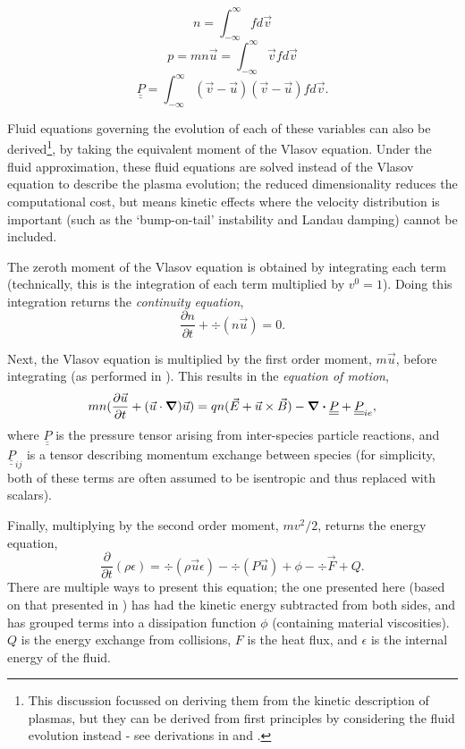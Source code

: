 \begin{equation} n = \int^{\infty}_{-\infty} f d\vec{v}  \end{equation}
\begin{equation} p = mn\vec{u} = \int^{\infty}_{-\infty} \vec{v} f d\vec{v} \end{equation}
\begin{equation} \underline{\underline{P}} = \int^{\infty}_{-\infty} (\vec{v} - \vec{u})(\vec{v} - \vec{u}) f d\vec{v}.  \end{equation}

Fluid equations governing the evolution of each of these variables can also be derived\footnote{This discussion focussed on deriving them from the kinetic description of plasmas, but they can be derived from first principles by considering the fluid evolution instead - see derivations in \cite{Chen2015} and \cite{Piel2017}.}, by taking the equivalent moment of the Vlasov equation. Under the fluid approximation, these fluid equations are solved instead of the Vlasov equation to describe the plasma evolution; the reduced dimensionality reduces the computational cost, but means kinetic effects where the velocity distribution is important (such as the `bump-on-tail' instability and Landau damping) cannot be included.

The zeroth moment of the Vlasov equation is obtained by integrating each term (technically, this is the integration of each term multiplied by $v^0 = 1$). Doing this integration returns the \textit{continuity equation},
\begin{equation} \frac{\partial n}{\partial t} + \div (n \vec{u}) = 0. \end{equation}

Next, the Vlasov equation is multiplied by the first order moment, $m\vec{u}$, before integrating (as performed in \cite{Chen2015}). This results in the \textit{equation of motion},
\begin{equation} mn(\frac{\partial \vec{u}}{\partial t} + (\vec{u} \cdot \grad)\vec{u}) = qn(\vec{E} + \vec{u} \times \vec{B}) - \div \underline{\underline{P}} + \underline{\underline{P}}_{ie} ,\end{equation}
where $\underline{\underline{P}}$ is the pressure tensor arising from inter-species particle reactions, and $\underline{\underline{P}}_{ij}$ is a tensor describing momentum exchange between species (for simplicity, both of these terms are often assumed to be isentropic and thus replaced with scalars).

Finally, multiplying by the second order moment, $mv^2 / 2$, returns the energy equation,
\begin{equation} \frac{ \partial}{\partial t} (\rho \epsilon) = \div (\rho \vec{u} \epsilon) - \div (P \vec{u}) + \phi - \div \vec{F} + Q. \label{eqn: Energy equation} \end{equation}
There are multiple ways to present this equation; the one presented here (based on that presented in \cite{Colvin2013}) has had the kinetic energy subtracted from both sides, and has grouped terms into a dissipation function $\phi$ (containing material viscosities). $Q$ is the energy exchange from collisions, $F$ is the heat flux, and $\epsilon$ is the internal energy of the fluid.

